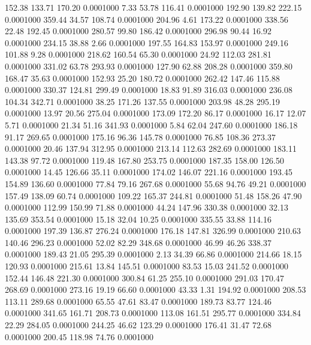  152.38  133.71  170.20   0.0001000
   7.33   53.78  116.41   0.0001000
 192.90  139.82  222.15   0.0001000
 359.44   34.57  108.74   0.0001000
 204.96    4.61  173.22   0.0001000
 338.56   22.48  192.45   0.0001000
 280.57   99.80  186.42   0.0001000
 296.98   90.44   16.92   0.0001000
 234.15   38.88    2.66   0.0001000
 197.55  164.83  153.97   0.0001000
 249.16  101.88    9.28   0.0001000
 218.62  160.54   65.30   0.0001000
  24.92  112.03  281.81   0.0001000
 331.02   63.78  293.93   0.0001000
 127.90   62.88  208.28   0.0001000
 359.80  168.47   35.63   0.0001000
 152.93   25.20  180.72   0.0001000
 262.42  147.46  115.88   0.0001000
 330.37  124.81  299.49   0.0001000
  18.83   91.89  316.03   0.0001000
 236.08  104.34  342.71   0.0001000
  38.25  171.26  137.55   0.0001000
 203.98   48.28  295.19   0.0001000
  13.97   20.56  275.04   0.0001000
 173.09  172.20   86.17   0.0001000
  16.17   12.07    5.71   0.0001000
  21.34   51.16  341.93   0.0001000
   5.84   62.04  247.60   0.0001000
 186.18   91.17  269.65   0.0001000
 175.16   96.36  145.78   0.0001000
  76.85  108.36  273.37   0.0001000
  20.46  137.94  312.95   0.0001000
 213.14  112.63  282.69   0.0001000
 183.11  143.38   97.72   0.0001000
 119.48  167.80  253.75   0.0001000
 187.35  158.00  126.50   0.0001000
  14.45  126.66   35.11   0.0001000
 174.02  146.07  221.16   0.0001000
 193.45  154.89  136.60   0.0001000
  77.84   79.16  267.68   0.0001000
  55.68   94.76   49.21   0.0001000
 157.49  138.09   60.74   0.0001000
 109.22  165.37  244.81   0.0001000
  51.48  158.26   47.90   0.0001000
 112.99  150.99   71.88   0.0001000
  44.24  147.96  330.38   0.0001000
  32.13  135.69  353.54   0.0001000
  15.18   32.04   10.25   0.0001000
 335.55   33.88  114.16   0.0001000
 197.39  136.87  276.24   0.0001000
 176.18  147.81  326.99   0.0001000
 210.63  140.46  296.23   0.0001000
  52.02   82.29  348.68   0.0001000
  46.99   46.26  338.37   0.0001000
 189.43   21.05  295.39   0.0001000
   2.13   34.39   66.86   0.0001000
 214.66   18.15  120.93   0.0001000
 215.61   13.84  145.51   0.0001000
  83.53   15.03  241.52   0.0001000
 152.44  146.48  221.30   0.0001000
 300.84   61.25  255.10   0.0001000
 291.03  170.47  268.69   0.0001000
 273.16   19.19   66.60   0.0001000
  43.33    1.31  194.92   0.0001000
 208.53  113.11  289.68   0.0001000
  65.55   47.61   83.47   0.0001000
 189.73   83.77  124.46   0.0001000
 341.65  161.71  208.73   0.0001000
 113.08  161.51  295.77   0.0001000
 334.84   22.29  284.05   0.0001000
 244.25   46.62  123.29   0.0001000
 176.41   31.47   72.68   0.0001000
 200.45  118.98   74.76   0.0001000
